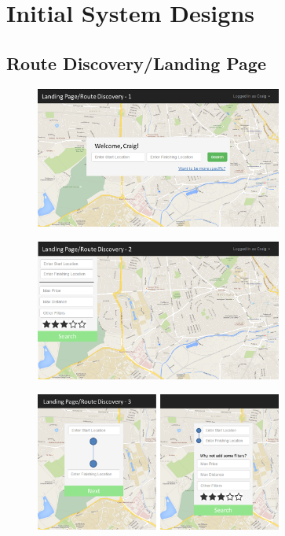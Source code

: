 \section{Initial System Designs}
\label{sec:isd}
\subsection{Route Discovery/Landing Page}
\begin{figure}[!ht]
    \begin{center}
        \includegraphics[width=0.725\textwidth]{images/appendix/landing1.png}
    \end{center}
    \vspace{-6mm}
\end{figure}

\begin{figure}[!ht]
    \begin{center}
        \includegraphics[width=0.725\textwidth]{images/appendix/landing2.png}
    \end{center}
    \vspace{-6mm}
\end{figure}

\begin{figure}[!ht]
    \begin{center}
        \includegraphics[width=0.725\textwidth]{images/appendix/landing3.png}
    \end{center}
    \vspace{-6mm}
\end{figure}

